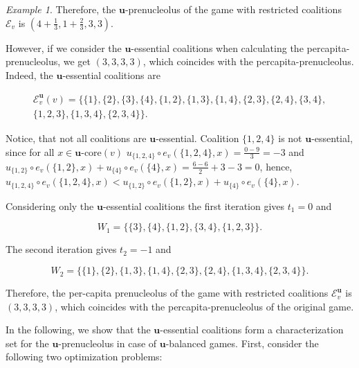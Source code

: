 \documentclass[a4paper,12pt]{article}
\theoremstyle{definition}
\theoremstyle{remark}
\newtheorem{example}[theorem]{Example}
\begin{document}
\begin{example}
Therefore, the $\mathbf{u}$-prenucleolus of the game with restricted coalitions $\mathcal{E}_v$ is $(4 + \frac{1}{3}, 1 + \frac{2}{3}, 3, 3)$.

However, if we consider the $\mathbf{u}$-essential coalitions when calculating the percapita-prenucleolus, we get $(3, 3, 3, 3)$, which coincides with the percapita-prenucleolus. Indeed, the $\mathbf{u}$-essential coalitions are 

\begin{equation*}
\begin{split}
\mathcal{E}_v^{\mathbf{u}}(v) = \{ \{ 1\} , \{ 2\} , \{ 3\} , \{ 4\} , \{ 1, 2\} , \{ 1, 3\} , \{ 1, 4\} , \{ 2, 3\} , \{ 2, 4\} , \{ 3, 4\} ,\\
 \{ 1, 2, 3\} ,\{ 1, 3, 4\} , \{ 2, 3, 4\}  \} .
\end{split}
\end{equation*}

Notice, that not all coalitions are $\mathbf{u}$-essential.  Coalition $\{ 1, 2, 4\}$ is not $\mathbf{u}$-essential, since for all $x\in \mathbf{u}$-core$(v)$ $u_{\{ 1, 2, 4 \} } \circ e_v(\{ 1, 2, 4\} , x ) = \frac{0-9}{3} = -3$ and $u_{\{ 1, 2\} } \circ e_v(\{ 1, 2\} , x) + u_{\{ 4\} } \circ e_v(\{ 4\} , x) = \frac{6-6}{2} + 3-3 = 0$, hence, $u_{\{ 1, 2, 4 \} } \circ e_v(\{ 1, 2, 4\} , x ) < u_{\{ 1, 2\} } \circ e_v(\{ 1, 2\} , x) + u_{\{ 4\} } \circ e_v(\{ 4\} , x)$.

Considering only the $\mathbf{u}$-essential coalitions the first iteration gives $t_1 = 0$ and 

\begin{equation*}
W_1 = \{ \{ 3\} , \{ 4\} , \{ 1, 2\} , \{ 3, 4\} , \{ 1, 2, 3\} \}.
\end{equation*}

The second iteration gives $t_2 = -1$ and 

\begin{equation*}
W_2 = \{ \{ 1\} , \{ 2\} , \{ 1, 3\} , \{ 1, 4\} , \{ 2, 3\} , \{ 2, 4\} , \{ 1, 3, 4\} , \{ 2, 3, 4\} \}.
\end{equation*}

Therefore, the per-capita prenucleolus of the game with restricted coalitions $\mathcal{E}_v^{\mathbf{u}}$ is $(3, 3, 3, 3)$, which coincides with the percapita-prenucleolus of the original game.
\end{example}


In the following, we show that the $\mathbf{u}$-essential coalitions form a characterization set for the $\mathbf{u}$-prenucleolus in case of $\mathbf{u}$-balanced games. First, consider the following two optimization problems:
\end{document}
